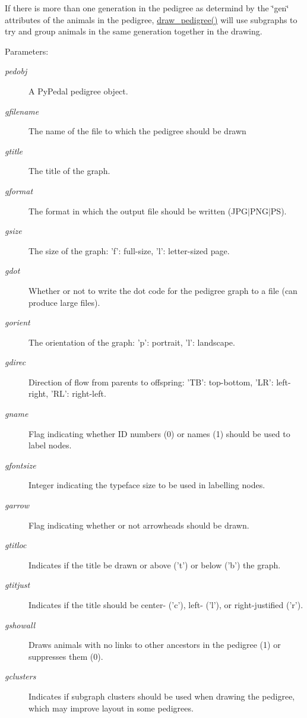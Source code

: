 If there is more than one generation in the pedigree as determind by the \char`\"{}gen\char`\"{} attributes of the animals in the pedigree, \hyperlink{namespacePyPedal_1_1pyp__graphics_60eaf4bd218e2b1f32385ce9e6b8e066}{draw\_\-pedigree()} will use subgraphs to try and group animals in the same generation together in the drawing. \begin{Desc}
\item[Parameters:]
\begin{description}
\item[{\em pedobj}]A Py\-Pedal pedigree object. \item[{\em gfilename}]The name of the file to which the pedigree should be drawn \item[{\em gtitle}]The title of the graph. \item[{\em gformat}]The format in which the output file should be written (JPG$|$PNG$|$PS). \item[{\em gsize}]The size of the graph: 'f': full-size, 'l': letter-sized page. \item[{\em gdot}]Whether or not to write the dot code for the pedigree graph to a file (can produce large files). \item[{\em gorient}]The orientation of the graph: 'p': portrait, 'l': landscape. \item[{\em gdirec}]Direction of flow from parents to offspring: 'TB': top-bottom, 'LR': left-right, 'RL': right-left. \item[{\em gname}]Flag indicating whether ID numbers (0) or names (1) should be used to label nodes. \item[{\em gfontsize}]Integer indicating the typeface size to be used in labelling nodes. \item[{\em garrow}]Flag indicating whether or not arrowheads should be drawn. \item[{\em gtitloc}]Indicates if the title be drawn or above ('t') or below ('b') the graph. \item[{\em gtitjust}]Indicates if the title should be center- ('c'), left- ('l'), or right-justified ('r'). \item[{\em gshowall}]Draws animals with no links to other ancestors in the pedigree (1) or suppresses them (0). \item[{\em gclusters}]Indicates if subgraph clusters should be used when drawing the pedigree, which may improve layout in some pedigrees. \end{description}
\end{Desc}
